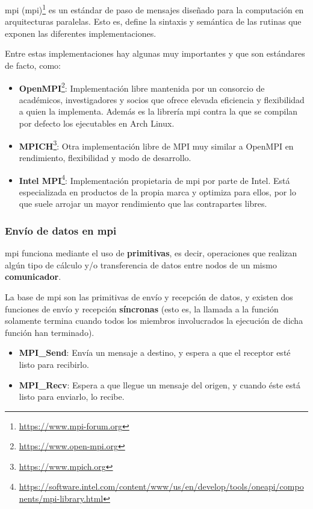 \acrshort{mpi} (\acrlong{mpi})\footnote{\url{https://www.mpi-forum.org}} es un estándar de paso de mensajes diseñado para la computación en arquitecturas paralelas. Esto es, define la sintaxis y semántica de las rutinas que exponen las diferentes implementaciones.

Entre estas implementaciones hay algunas muy importantes y que son estándares de facto, como:
\begin{itemize}
  \item\textbf{OpenMPI}\footnote{\url{https://www.open-mpi.org}}: Implementación libre mantenida por un consorcio de académicos, investigadores y socios que ofrece elevada eficiencia y flexibilidad a quien la implementa. Además es la librería \acrshort{mpi} contra la que se compilan por defecto los ejecutables en Arch Linux.
  \item\textbf{MPICH}\footnote{\url{https://www.mpich.org}}: Otra implementación libre de MPI muy similar a OpenMPI en rendimiento, flexibilidad y modo de desarrollo.
  \item\textbf{Intel MPI}\footnote{\url{https://software.intel.com/content/www/us/en/develop/tools/oneapi/components/mpi-library.html}}: Implementación propietaria de \acrshort{mpi} por parte de Intel. Está especializada en productos de la propia marca y optimiza para ellos, por lo que suele arrojar un mayor rendimiento que las contrapartes libres.
\end{itemize}

\subsubsection{Envío de datos en \acrshort{mpi}}
\acrshort{mpi} funciona mediante el uso de \textbf{primitivas}, es decir, operaciones que realizan algún tipo de cálculo y/o transferencia de datos entre nodos de un mismo \textbf{comunicador}.

La base de \acrshort{mpi} son las primitivas de envío y recepción de datos, y existen dos funciones de envío y recepción \textbf{síncronas} (esto es, la llamada a la función solamente termina cuando todos los miembros involucrados la ejecución de dicha función han terminado).
\begin{itemize}
  \item \textbf{MPI\_Send}: Envía un mensaje a destino, y espera a que el receptor esté listo para recibirlo. 
  \item \textbf{MPI\_Recv}: Espera a que llegue un mensaje del origen, y cuando éste está listo para enviarlo, lo recibe.
\end{itemize}

